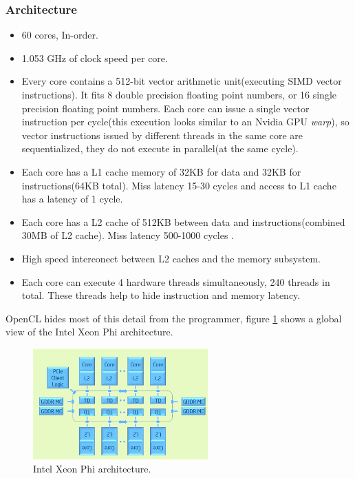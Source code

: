 \subsubsection{Architecture}
\begin{itemize}
    \item 60 cores, In-order\cite{phi_specs}.
    \item 1.053 GHz of clock speed per core\cite{phi_specs}.
    \item Every core contains a 512-bit vector arithmetic unit(executing SIMD vector instructions). It fits 8 double precision 
        floating point numbers, or 16 single precision floating point numbers. Each core can issue a single vector instruction per
        cycle\cite{opencl_phi}(this execution looks similar to an Nvidia GPU \emph{warp}), so vector instructions issued by 
        different threads in the same core are sequentialized, they do not execute in parallel(at the same cycle).
    \item Each core has a L1 cache memory of 32KB for data and 32KB for instructions(64KB total). Miss latency 15-30
        cycles and access to L1 cache has a latency of 1 cycle\cite{opencl_phi}.
    \item Each core has a L2 cache of 512KB between data and instructions(combined 30MB of L2 cache). Miss latency 500-1000 cycles
        \cite{opencl_phi,phi_specs}.
    \item High speed interconect between L2 caches and the memory subsystem\cite{opencl_phi}.
    \item Each core can execute 4 hardware threads simultaneously, 240 threads in total. These threads help to hide 
        instruction and memory latency\cite{opencl_phi}.
\end{itemize}

\par{OpenCL hides most of this detail from the programmer, figure \ref{PhiArch} shows a global view of the Intel Xeon Phi 
    architecture.\cite{opencl_phi}}

\begin{figure}[!h]
    \centering
    \includegraphics[width=0.6\textwidth]{figures/phi_arch.png}
    \caption{Intel Xeon Phi architecture\cite{opencl_phi}.}
    \label{PhiArch}
\end{figure}

